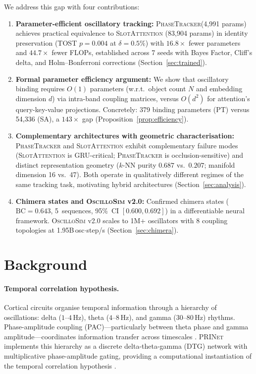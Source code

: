 \documentclass[11pt]{article}
\providecommand{\prinet}{\textnormal{\textsc{PRINet}}\xspace}
\providecommand{\oscillosim}{\textnormal{\textsc{OscilloSim}}\xspace}
\providecommand{\pt}{\textnormal{\textsc{PhaseTracker}}\xspace}
\providecommand{\sa}{\textnormal{\textsc{SlotAttention}}\xspace}
\providecommand{\bc}{\text{BC}}
\begin{document}
We address this gap with four contributions:
\begin{enumerate}[leftmargin=*,itemsep=2pt]
  \item \textbf{Parameter-efficient oscillatory tracking:}
        \pt (4{,}991 params) achieves practical equivalence to \sa
        (83{,}904 params) in identity preservation (TOST $p = 0.004$
        at $\delta = 0.5\%$) with $16.8\times$ fewer parameters and
        $44.7\times$ fewer FLOPs, established across 7 seeds with
        Bayes Factor, Cliff's delta, and Holm--Bonferroni corrections
        (Section~\ref{sec:trained}).
  \item \textbf{Formal parameter efficiency argument:}
        We show that oscillatory binding requires $O(1)$ parameters
        (w.r.t.\ object count $N$ and embedding dimension $d$) via
        intra-band coupling matrices, versus $O(d^2)$ for attention's
        query-key-value projections.  Concretely: 379 binding
        parameters (PT) versus 54{,}336 (SA), a $143\times$ gap
        (Proposition~\ref{prop:efficiency}).
  \item \textbf{Complementary architectures with geometric
        characterisation:}
        \pt and \sa exhibit complementary failure modes (\sa is
        GRU-critical; \pt is occlusion-sensitive) and distinct
        representation geometry ($k$-NN purity $0.687$ vs.\ $0.207$;
        manifold dimension 16 vs.\ 47).  Both operate in qualitatively
        different regimes of the same tracking task, motivating hybrid
        architectures (Section~\ref{sec:analysis}).
  \item \textbf{Chimera states and \oscillosim v2.0:}
        Confirmed chimera states ($\bc = 0.643$, 5~sequences, 95\%~CI
        $[0.600, 0.692]$) in a differentiable neural framework.
        \oscillosim v2.0 scales to 1M+ oscillators with 8 coupling
        topologies at 1.95B\,osc$\cdot$step/s
        (Section~\ref{sec:chimera}).
\end{enumerate}

\section{Background}
\label{sec:background}

\paragraph{Temporal correlation hypothesis.}
Cortical circuits organise temporal information through a hierarchy of
oscillations: delta ($1$--$4$\,Hz), theta ($4$--$8$\,Hz), and gamma
($30$--$80$\,Hz) rhythms.  Phase-amplitude coupling (PAC)---particularly
between theta phase and gamma amplitude---coordinates information
transfer across timescales \citep{singer1995visual,fries2005mechanism}.
\prinet implements this hierarchy as a discrete delta-theta-gamma (DTG)
network with multiplicative phase-amplitude gating, providing a
computational instantiation of the temporal correlation hypothesis
\citep{vonDerMalsburg1981,engel2001dynamic}.
\end{document}
